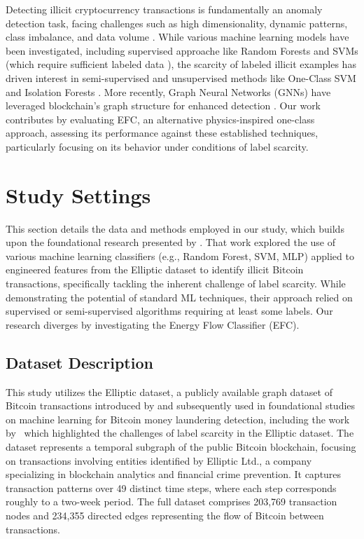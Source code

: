 \documentclass[12pt]{article}
\begin{document}
Detecting illicit cryptocurrency transactions is fundamentally an anomaly detection task, facing challenges such as high
dimensionality, dynamic patterns, class imbalance, and data volume \cite{samariya2023comprehensive, li2023survey,
pallathadka2022cryptocurrency}. While various machine learning models have been investigated, including supervised approache
like Random Forests and SVMs (which require sufficient labeled data \cite{lorenz2021machinelearningmethodsdetect,
chen2021bitcoin}), the scarcity of labeled illicit examples has driven interest in semi-supervised and unsupervised methods
like One-Class SVM and Isolation Forests \cite{lorenz2021machinelearningmethodsdetect, kehinde2024machine}. More recently,
Graph Neural Networks (GNNs) have leveraged blockchain's graph structure for enhanced detection
\cite{weber2019antimoneylaunderingbitcoinexperimenting}. Our work contributes by evaluating EFC, an alternative
physics-inspired one-class approach, assessing its performance against these established techniques, particularly focusing
on its behavior under conditions of label scarcity.

\section{Study Settings} \label{sec:methods}
This section details the data and methods employed in our study, which builds upon the foundational research presented
by \cite{lorenz2021machinelearningmethodsdetect}. That work explored the use of various machine learning classifiers
(e.g., Random Forest, SVM, MLP) applied to engineered features from the Elliptic dataset to identify illicit Bitcoin
transactions, specifically tackling the inherent challenge of label scarcity. While demonstrating the potential of standard
ML techniques, their approach relied on supervised or semi-supervised algorithms requiring at least some labels. Our research
diverges by investigating the Energy Flow Classifier (EFC). 

\subsection{Dataset Description} \label{subsec:dataset}
This study utilizes the Elliptic dataset, a publicly available graph dataset of Bitcoin transactions introduced by 
\cite{weber2019antimoneylaunderingbitcoinexperimenting} and subsequently used in foundational studies on machine
learning for Bitcoin money laundering detection, including the work by~\cite{lorenz2021machinelearningmethodsdetect}
which highlighted the challenges of label scarcity in the Elliptic dataset. The dataset represents a temporal subgraph
of the public Bitcoin blockchain, focusing on transactions involving entities identified by Elliptic Ltd., a company
specializing in blockchain analytics and financial crime prevention. It captures transaction patterns over 49 distinct
time steps, where each step corresponds roughly to a two-week period. The full dataset comprises 203,769 transaction nodes
and 234,355 directed edges representing the flow of Bitcoin between transactions.
\end{document}
